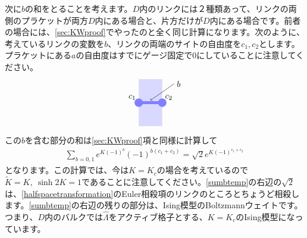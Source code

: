 \documentclass[report,paper=a4, fontsize=12pt, line_length=16cm, number_of_lines=33,dvipdfmx]{jlreq}
\numberwithin{equation}{chapter}
\newcommand{\Kt}{\widetilde{K}}
\newcommand{\Lambdah}{\widehat{\Lambda}}
\begin{document}
次に$b$の和をとることを考えます。$D$内のリンクには２種類あって、リンクの両側のプラケットが両方$D$内にある場合と、片方だけが$D$内にある場合です。前者の場合には、\ref{sec:KWproof}でやったのと全く同じ計算になります。次のように、考えているリンクの変数を$b$、リンクの両端のサイトの自由度を$c_1,c_2$とします。プラケットにある$a$の自由度はすでにゲージ固定で$0$にしていることに注意してください。
\begin{align}
  \begin{tikzpicture}
    \coordinate (C1) at (0,0) node [above left] at (C1) {$c_1$};
    \coordinate (C2) at (1,0) node [above right] at (C2) {$c_2$};
    \fill[plaqblue](0,0) rectangle (1,1);
    \fill[plaqblue](0,-1) rectangle (1,0);
    \fill[linkblue] (C1) circle (1.8mm);
    \fill[linkblue] (C2) circle (1.8mm);
    \draw[linkblue, line width = 1.3mm] (C1)--(C2);
    \coordinate (B) at (1.5,0.8) node [right] at (B){$b$};
    \draw[->] (B)--(0.5,0.1);
\end{tikzpicture}
\end{align}
この$b$を含む部分の和は\ref{sec:KWproof}項と同様に計算して
\begin{align}
  \sum_{b=0,1}e^{K(-1)^{b}}(-1)^{b(c_1+c_2)}
  =\sqrt{2}e^{K(-1)^{c_1+c_2}}
  \label{sumbtemp}
\end{align}
となります。この計算では、今は$K=K_c$の場合を考えているので$\Kt=K,\ \sinh 2K=1$であることに注意してください。\eqref{sumbtemp}の右辺の$\sqrt{2}$は、\eqref{halfspacetransformation}のEuler相殺項のリンクのところとちょうど相殺します。\eqref{sumbtemp}の右辺の残りの部分は、Ising模型のBoltzmannウェイトです。つまり、$D$内のバルクでは$\Lambdah$をアクティブ格子とする、$K=K_c$のIsing模型になっています。
\end{document}
